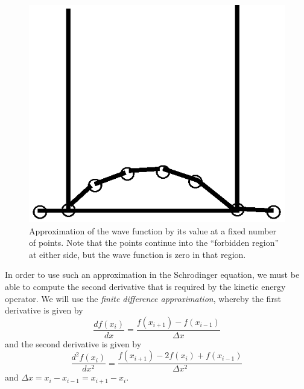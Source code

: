 \begin{figure}
\begin{center}
\includegraphics[scale=0.5]{pbox_points.eps}
\caption{Approximation of the wave function by its value at a fixed
number of points. Note that the points continue into
the ``forbidden region'' at either side, but the wave function is zero
in that region.}
\label{pbox_points}
\end{center}
\end{figure}

In order to use such an approximation in the Schrodinger equation, we
must be able to compute the second derivative that is required by the
kinetic energy operator. We will use the \emph{finite difference
approximation}, whereby the first derivative is given by
\begin{equation}
	\frac{df(x_i)}{dx} = \frac{f(x_{i+1})-f(x_{i-1})}{\Delta x}
\end{equation}
and the second derivative is given by
\begin{equation}
	\frac{d^2f(x_i)}{dx^2} = \frac{f(x_{i+1})-2f(x_i)+f(x_{i-1})}
					{\Delta x^2}
\end{equation}	
and $\Delta x=x_i-x_{i-1}=x_{i+1}-x_i$.

